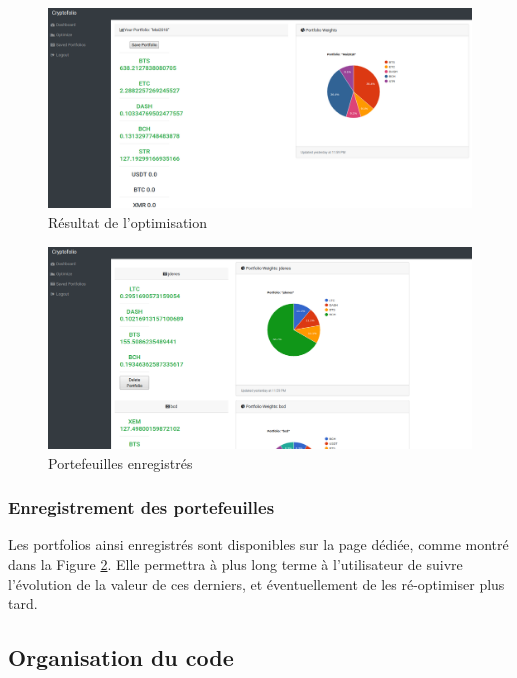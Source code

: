 \documentclass[a4paper, 10pt]{article}
\begin{document}
\begin{figure}[ht!]
\begin{center}
\includegraphics[width=1.0\textwidth]{images/Result.png}
\caption{Résultat de l'optimisation}
\label{fig:results}
\end{center}
\end{figure}

\begin{figure}[ht!]
\begin{center}
\includegraphics[width=1.0\textwidth]{images/SavedPortfolios.png}
\caption{Portefeuilles enregistrés}
\label{fig:saved}
\end{center}
\end{figure}

\subsubsection{Enregistrement des portefeuilles}
\label{sec:developpement_pages_save}

Les portfolios ainsi enregistrés sont disponibles sur la page dédiée, comme montré dans la Figure \ref{fig:saved}. Elle permettra à plus long terme à l'utilisateur de suivre l'évolution de la valeur de ces derniers, et éventuellement de les ré-optimiser plus tard.

\subsection{Organisation du code}
\label{sec:developpement_code}
\end{document}

